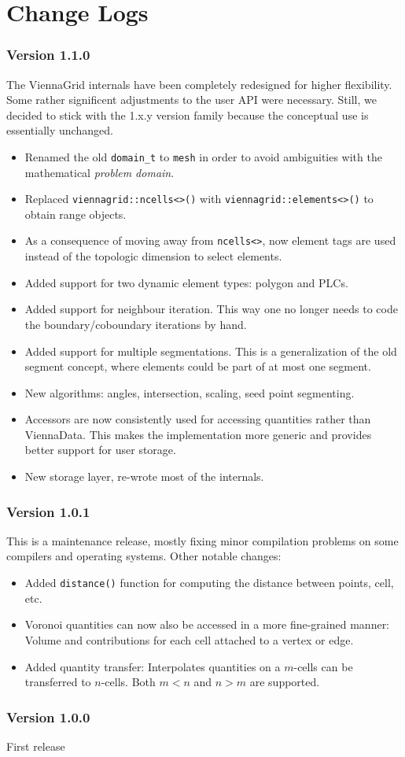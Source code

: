 
\chapter{Change Logs}

\subsection*{Version 1.1.0}
The ViennaGrid internals have been completely redesigned for higher flexibility.
Some rather significent adjustments to the user API were necessary.
Still, we decided to stick with the 1.x.y version family because the conceptual use is essentially unchanged.
\begin{itemize}
 \item Renamed the old \lstinline|domain_t| to \lstinline|mesh| in order to avoid ambiguities with the mathematical \emph{problem domain}.
 \item Replaced \lstinline|viennagrid::ncells<>()| with \lstinline|viennagrid::elements<>()| to obtain range objects.
 \item As a consequence of moving away from \lstinline|ncells<>|, now element tags are used instead of the topologic dimension to select elements. 
 \item Added support for two dynamic element types: polygon and PLCs.
 \item Added support for neighbour iteration. This way one no longer needs to code the boundary/coboundary iterations by hand.
 \item Added support for multiple segmentations. This is a generalization of the old segment concept, where elements could be part of at most one segment.
 \item New algorithms: angles, intersection, scaling, seed point segmenting.
 \item Accessors are now consistently used for accessing quantities rather than ViennaData. This makes the implementation more generic and provides better support for user storage.
 \item New storage layer, re-wrote most of the internals.
\end{itemize}

\subsection*{Version 1.0.1}
This is a maintenance release, mostly fixing minor compilation problems on some compilers and operating systems. Other notable changes:
\begin{itemize}
  \item Added \lstinline|distance()| function for computing the distance between points, cell, etc.
  \item Voronoi quantities can now also be accessed in a more fine-grained manner: Volume and contributions for each cell attached to a vertex or edge.
  \item Added quantity transfer: Interpolates quantities on a $m$-cells can be transferred to $n$-cells. Both $m<n$ and $n>m$ are supported.
\end{itemize}

\subsection*{Version 1.0.0}
First release
